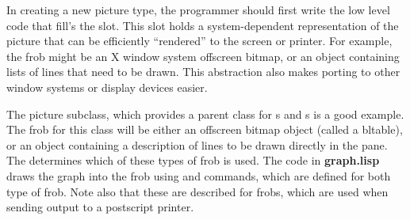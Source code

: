 In creating a new picture type, the programmer should first write the
low level code that fill's the  slot.
This slot holds a system-dependent representation of the picture that
can be efficiently ``rendered'' to the screen or printer.  For
example, the frob might be an X window system offscreen bitmap, or an
object containing lists of lines that need to be drawn.  This
abstraction also makes porting to other window systems or display
devices easier.

The  picture subclass, which provides a parent class
for s and s is a good example.  The
frob for this class will be either an offscreen bitmap object (called
a bltable), or an object containing a description of lines to be drawn
directly in the pane.  The  determines which of
these types of frob is used.  The code in {\bf graph.lisp} draws the
graph into the frob using  and 
commands, which are defined for both type of frob.  Note also that
these are described for  frobs, which are
used when sending output to  a postscript printer.

